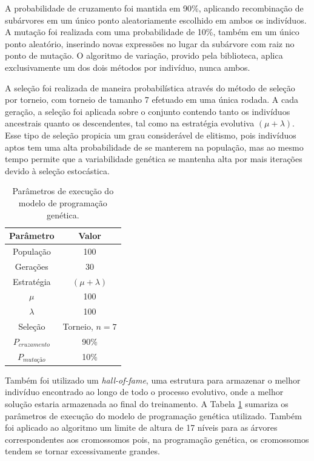 \documentclass[
	12pt,				%
	openright,			%
	twoside,			%
	a4paper,			%
	tcc,			%
	]{ABNT-DC-UEL}
\begin{document}
A probabilidade de cruzamento foi mantida em 90\%, aplicando recombinação de subárvores em um único ponto aleatoriamente escolhido em ambos os indivíduos. A mutação foi realizada com uma probabilidade de 10\%, também em um único ponto aleatório, inserindo novas expressões no lugar da subárvore com raiz no ponto de mutação. O algoritmo de variação, provido pela biblioteca, aplica exclusivamente um dos dois métodos por indivíduo, nunca ambos.

A seleção foi realizada de maneira probabilística através do método de seleção por torneio, com torneio de tamanho 7 efetuado em uma única rodada. A cada geração, a seleção foi aplicada sobre o conjunto contendo tanto os indivíduos ancestrais quanto os descendentes, tal como na estratégia evolutiva $(\mu + \lambda)$. Esse tipo de seleção propicia um grau considerável de elitismo, pois indivíduos aptos tem uma alta probabilidade de se manterem na população, mas ao mesmo tempo permite que a variabilidade genética se mantenha alta por mais iterações devido à seleção estocástica. 

\begin{table}[htb]
    \centering
    \begin{tabular}{cc}
        \hline
        \textbf{Parâmetro} & \textbf{Valor} \\
        \hline
        População & 100 \\
        Gerações & 30 \\
        Estratégia & $(\mu + \lambda)$ \\
        $\mu$ & 100 \\
        $\lambda$ & 100 \\
        Seleção & Torneio, $n = 7$ \\
        $P_\textit{cruzamento}$ & 90\% \\
        $P_\textit{mutação}$ & 10\% \\
        \hline
    \end{tabular}
    \caption{Parâmetros de execução do modelo de programação genética.}
    \label{tab:parametros-prog-genetica}
\end{table}

Também foi utilizado um \textit{hall-of-fame}, uma estrutura para armazenar o melhor indivíduo encontrado ao longo de todo o processo evolutivo, onde a melhor solução estaria armazenada ao final do treinamento. A Tabela \ref{tab:parametros-prog-genetica} sumariza os parâmetros de execução do modelo de programação genética utilizado. Também foi aplicado ao algoritmo um limite de altura de 17 níveis para as árvores correspondentes aos cromossomos pois, na programação genética, os cromossomos tendem se tornar excessivamente grandes.
\end{document}
